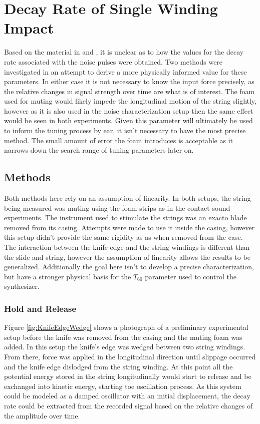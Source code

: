 \documentclass[../main.tex]{subfiles}
\begin{document}
\section{Decay Rate of Single Winding Impact}
Based on the material in  and , it is unclear as to how the values for the decay rate associated with the noise pulses were obtained. Two methods were investigated in an attempt to derive a more physically informed value for these parameters. In either case it is not necessary to know the input force precisely, as the relative changes in signal strength over time are what is of interest. The foam used for muting would likely impede the longitudinal motion of the string slightly, however as it is also used in the noise characterization setup then the same effect would be seen in both experiments. Given this parameter will ultimately be used to inform the tuning process by ear, it isn't necessary to have the most precise method. The small amount of error the foam introduces is acceptable as it narrows down the search range of tuning parameters later on.

\subsection{Methods}
Both methods here rely on an assumption of linearity. In both setups, the string being measured was muting using the foam strips as in the contact sound experiments. The instrument used to stimulate the strings was an exacto blade removed from its casing. Attempts were made to use it inside the casing, however this setup didn't provide the same rigidity as as when removed from the case. The interaction between the knife edge and the string windings is different than the slide and string, however the assumption of linearity  allows the results to be generalized. Additionally the goal here isn't to develop a precise characterization, but have a stronger physical basis for the $T_{60}$ parameter used to control the synthesizer. 

\subsubsection{Hold and Release}
Figure \ref{fig:KnifeEdgeWedge} shows a photograph of a preliminary experimental setup before the knife was removed from the casing and the muting foam was added. In this setup the knife's edge was wedged between two string windings. From there, force was applied in the longitudinal direction until slippage occurred and the knife edge dislodged from the string winding. At this point all the potential energy stored in the string longitudinally would start to release and be exchanged into kinetic energy, starting toe oscillation process. As this system could be modeled as a damped oscillator with an initial displacement, the decay rate could be extracted from the recorded signal based on the relative changes of the amplitude over time.
\end{document}
